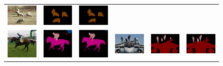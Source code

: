 \begin{figure}[!htbp]
{\begin{tabular}{c c c | c c c}
    \includegraphics[height=0.12\linewidth]{fig/img/2010_001079.jpg} &
    \includegraphics[height=0.12\linewidth]{fig/res_none/2010_001079.png} &
    \includegraphics[height=0.12\linewidth]{fig/res_crf/2010_001079.png} \\
    \includegraphics[height=0.12\linewidth]{fig/img/2010_000038.jpg} &
    \includegraphics[height=0.12\linewidth]{fig/res_none/2010_000038.png} &
    \includegraphics[height=0.12\linewidth]{fig/res_crf/2010_000038.png} &
    \includegraphics[height=0.12\linewidth]{fig/img/2010_001024.jpg} &
    \includegraphics[height=0.12\linewidth]{fig/res_none/2010_001024.png} &
    \includegraphics[height=0.12\linewidth]{fig/res_crf/2010_001024.png} \\

\end{tabular}}
\end{figure}
